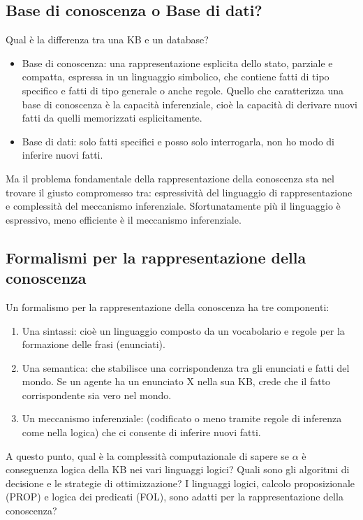 \documentclass{article}
\begin{document}
\subsection{Base di conoscenza o Base di dati?}
Qual è la differenza tra una KB e un database?
\begin{itemize}
    \item Base di conoscenza: una rappresentazione esplicita dello stato, parziale e compatta, espressa in un linguaggio simbolico, che contiene fatti di tipo specifico e fatti di tipo generale o anche regole. Quello che caratterizza una base di conoscenza è la capacità inferenziale, cioè la capacità di derivare nuovi fatti da quelli memorizzati esplicitamente. 
    \item Base di dati: solo fatti specifici e posso solo interrogarla, non ho modo di inferire nuovi fatti.
\end{itemize}
Ma il problema fondamentale della rappresentazione della conoscenza sta nel trovare il giusto compromesso tra: espressività del linguaggio di rappresentazione e complessità del meccanismo inferenziale. Sfortunatamente più il linguaggio è espressivo, meno  efficiente è il meccanismo inferenziale. 

\subsection{Formalismi per la rappresentazione della conoscenza}
Un formalismo per la rappresentazione della conoscenza ha tre componenti:
\begin{enumerate}
    \item Una sintassi: cioè un linguaggio composto da un vocabolario e regole per la formazione delle frasi (enunciati).
    \item Una semantica: che stabilisce una corrispondenza tra gli enunciati e fatti del mondo. Se un agente ha un enunciato X nella sua KB, crede che il fatto corrispondente sia vero nel mondo.
    \item Un meccanismo inferenziale: (codificato o meno tramite regole di inferenza come nella logica) che ci consente di inferire nuovi fatti. 
\end{enumerate}
A questo punto, qual è la complessità computazionale di sapere se $\alpha$ è conseguenza logica della KB nei vari linguaggi logici? Quali sono gli algoritmi di decisione e le strategie di ottimizzazione? I linguaggi logici, calcolo proposizionale (PROP) e logica dei predicati (FOL), sono adatti per la rappresentazione della conoscenza?
\end{document}
